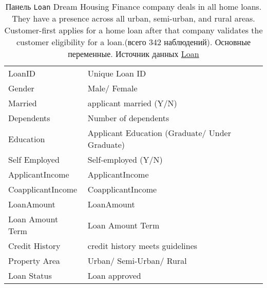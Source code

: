 \documentclass[12pt]{article}
\theoremstyle{remark}
\begin{document}
\begin{table}
	\caption{Панель \texttt{Loan}
	Dream Housing Finance company deals in all home loans. They have a presence across all urban, semi-urban, and rural areas. Customer-first applies for a home loan after that company validates the customer eligibility for a loan.(всего 342 наблюдений).  Основные переменные.
	Источник данных \href{https://www.kaggle.com/datasets/vikasukani/loan-eligible-dataset?select=loan-train.csv}{Loan}}
	\label{Gasoline}
	\begin{tabular}{l|l}\hline
	LoanID & Unique Loan ID \\
	Gender & Male/ Female  \\
	Married & applicant married (Y/N) \\
	Dependents & Number of dependents \\
Education & Applicant Education (Graduate/ Under Graduate)\\
Self Employed & Self-employed (Y/N)\\
ApplicantIncome & ApplicantIncome\\
CoapplicantIncome & CoapplicantIncome \\
LoanAmount & LoanAmount \\
Loan Amount Term & Loan Amount Term \\
Credit History & credit history meets guidelines \\
Property Area & Urban/ Semi-Urban/ Rural \\
Loan Status &	Loan approved \\
	\hline
	\end{tabular}
\end{table}
\newpage
\end{document}
